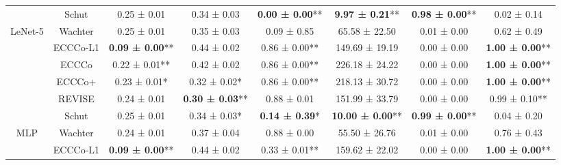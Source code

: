\begin{table}
{\begin{tabular}[t]{cccccccc}
 & Schut & 0.25 ± 0.01\hphantom{*}\hphantom{*} & 0.34 ± 0.03\hphantom{*}\hphantom{*} & \textbf{0.00 ± 0.00}** & \textbf{9.97 ± 0.21}** & \textbf{0.98 ± 0.00}** & 0.02 ± 0.14\hphantom{*}\hphantom{*}\\

\multirow[t]{-6}{*}{\centering\arraybackslash LeNet-5} & Wachter & 0.25 ± 0.01\hphantom{*}\hphantom{*} & 0.35 ± 0.03\hphantom{*}\hphantom{*} & 0.09 ± 0.85\hphantom{*}\hphantom{*} & 65.58 ± 22.50\hphantom{*}\hphantom{*} & 0.01 ± 0.00\hphantom{*}\hphantom{*} & 0.62 ± 0.49\hphantom{*}\hphantom{*}\\
\cmidrule{1-8}
 & ECCCo-L1 & \textbf{0.09 ± 0.00}** & 0.44 ± 0.02\hphantom{*}\hphantom{*} & 0.86 ± 0.00** & 149.69 ± 19.19\hphantom{*}\hphantom{*} & 0.00 ± 0.00\hphantom{*}\hphantom{*} & \textbf{1.00 ± 0.00}**\\

 & ECCCo & 0.22 ± 0.01** & 0.42 ± 0.02\hphantom{*}\hphantom{*} & 0.86 ± 0.00** & 226.18 ± 24.22\hphantom{*}\hphantom{*} & 0.00 ± 0.00\hphantom{*}\hphantom{*} & \textbf{1.00 ± 0.00}**\\

 & ECCCo+ & 0.23 ± 0.01*\hphantom{*} & 0.32 ± 0.02*\hphantom{*} & 0.86 ± 0.00** & 218.13 ± 30.72\hphantom{*}\hphantom{*} & 0.00 ± 0.00\hphantom{*}\hphantom{*} & \textbf{1.00 ± 0.00}**\\

 & REVISE & 0.24 ± 0.01\hphantom{*}\hphantom{*} & \textbf{0.30 ± 0.03}** & 0.88 ± 0.01\hphantom{*}\hphantom{*} & 151.99 ± 33.79\hphantom{*}\hphantom{*} & 0.00 ± 0.00\hphantom{*}\hphantom{*} & 0.99 ± 0.10**\\

 & Schut & 0.25 ± 0.01\hphantom{*}\hphantom{*} & 0.34 ± 0.03*\hphantom{*} & \textbf{0.14 ± 0.39}*\hphantom{*} & \textbf{10.00 ± 0.00}** & \textbf{0.99 ± 0.00}** & 0.04 ± 0.20\hphantom{*}\hphantom{*}\\

\multirow[t]{-6}{*}{\centering\arraybackslash MLP} & Wachter & 0.24 ± 0.01\hphantom{*}\hphantom{*} & 0.37 ± 0.04\hphantom{*}\hphantom{*} & 0.88 ± 0.00\hphantom{*}\hphantom{*} & 55.50 ± 26.76\hphantom{*}\hphantom{*} & 0.01 ± 0.00\hphantom{*}\hphantom{*} & 0.76 ± 0.43\hphantom{*}\hphantom{*}\\
\cmidrule{1-8}
 & ECCCo-L1 & \textbf{0.09 ± 0.00}** & 0.44 ± 0.02\hphantom{*}\hphantom{*} & 0.33 ± 0.01** & 159.62 ± 22.02\hphantom{*}\hphantom{*} & 0.00 ± 0.00\hphantom{*}\hphantom{*} & \textbf{1.00 ± 0.00}**\\


\end{tabular}}
\end{table}
